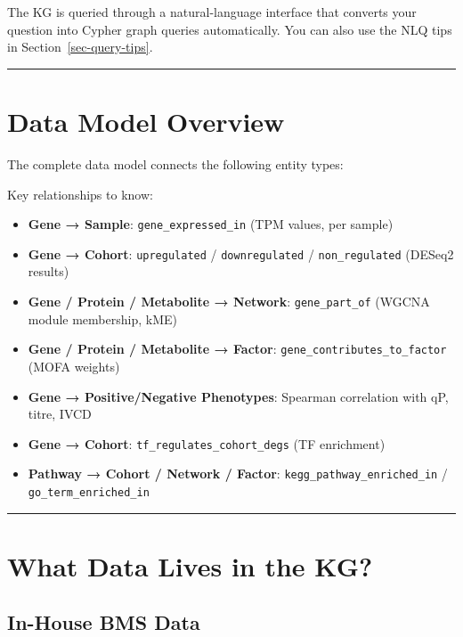 \documentclass[
  letterpaper,
  oneside,
  open=any]{scrbook}
\providecommand{\tightlist}{%
  \setlength{\itemsep}{0pt}\setlength{\parskip}{0pt}}
\begin{document}
The KG is queried through a natural-language interface that converts
your question into Cypher graph queries automatically. You can also use
the NLQ tips in Section~\ref{sec-query-tips}.

\begin{center}\rule{0.5\linewidth}{0.5pt}\end{center}

\section{Data Model Overview}\label{data-model-overview}

The complete data model connects the following entity types:

Key relationships to know:

\begin{itemize}
\tightlist
\item
  \textbf{Gene → Sample}: \texttt{gene\_expressed\_in} (TPM values, per
  sample)
\item
  \textbf{Gene → Cohort}: \texttt{upregulated} / \texttt{downregulated}
  / \texttt{non\_regulated} (DESeq2 results)
\item
  \textbf{Gene / Protein / Metabolite → Network}:
  \texttt{gene\_part\_of} (WGCNA module membership, kME)
\item
  \textbf{Gene / Protein / Metabolite → Factor}:
  \texttt{gene\_contributes\_to\_factor} (MOFA weights)
\item
  \textbf{Gene → Positive/Negative Phenotypes}: Spearman correlation
  with qP, titre, IVCD
\item
  \textbf{Gene → Cohort}: \texttt{tf\_regulates\_cohort\_degs} (TF
  enrichment)
\item
  \textbf{Pathway → Cohort / Network / Factor}:
  \texttt{kegg\_pathway\_enriched\_in} / \texttt{go\_term\_enriched\_in}
\end{itemize}

\begin{center}\rule{0.5\linewidth}{0.5pt}\end{center}

\section{What Data Lives in the KG?}\label{sec-data-contents}

\subsection{In-House BMS Data}\label{in-house-bms-data}
\end{document}
